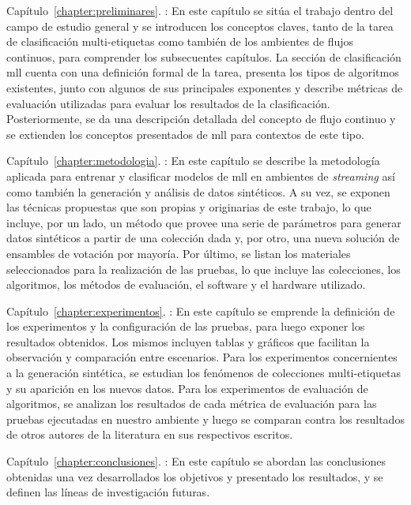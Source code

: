 \begin{description}

	\item{Capítulo~\ref{chapter:preliminares}. }:
	      En este capítulo se sitúa el trabajo dentro del campo de estudio general
	      y se introducen los conceptos claves, tanto de la tarea de clasificación
	      multi-etiquetas como también de los ambientes de flujos continuos, para
	      comprender los subsecuentes capítulos. La sección de clasificación
	      \acrshort{mll} cuenta con una definición formal de la tarea, presenta
	      los tipos de algoritmos existentes, junto con algunos de sus principales
	      exponentes y describe métricas de evaluación utilizadas para evaluar los
	      resultados de la clasificación.  Posteriormente, se da una descripción
	      detallada del concepto de flujo continuo y se extienden los conceptos
	      presentados de \acrshort{mll} para contextos de este tipo.

	\item{Capítulo~\ref{chapter:metodologia}. }: En
	      este capítulo se describe la metodología aplicada para entrenar y
	      clasificar modelos de \acrshort{mll} en ambientes de \textit{streaming}
	      así como también la generación y análisis de datos sintéticos. A su vez,
	      se exponen las técnicas propuestas que son propias y originarias de este
	      trabajo, lo que incluye, por un lado, un método que provee una serie de
	      parámetros para generar datos sintéticos a partir de una colección dada
	      y, por otro, una nueva solución de ensambles de votación por mayoría.
	      Por último, se listan los materiales seleccionados para la realización
	      de las pruebas, lo que incluye las colecciones, los algoritmos, los
	      métodos de evaluación, el software y el hardware utilizado.

	\item{Capítulo~\ref{chapter:experimentos}. }:
	      En este capítulo se emprende la definición de los experimentos y la
	      configuración de las pruebas, para luego exponer los resultados
	      obtenidos. Los mismos incluyen tablas y gráficos que facilitan la
	      observación y comparación entre escenarios. Para los experimentos
	      concernientes a la generación sintética, se estudian los fenómenos de
	      colecciones multi-etiquetas y su aparición en los nuevos datos. Para los
	      experimentos de evaluación de algoritmos, se analizan los resultados de
	      cada métrica de evaluación para las pruebas ejecutadas en nuestro
	      ambiente y luego se comparan contra los resultados de otros autores de
	      la literatura en sus respectivos escritos.

	\item{Capítulo~\ref{chapter:conclusiones}. }:
	      En este capítulo se abordan las conclusiones obtenidas una vez
	      desarrollados los objetivos y presentado los resultados, y se definen
	      las líneas de investigación futuras.

\end{description}
